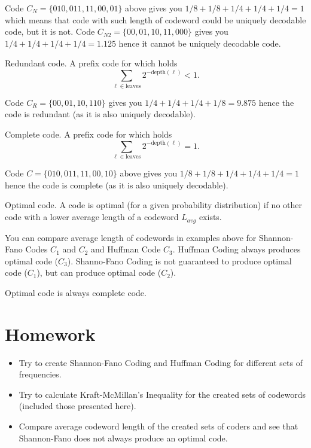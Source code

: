 Code $C_N = \{010, 011, 11, 00, 01\}$ above gives you $1/8 + 1/8 + 1/4 + 1/4 + 1/4 = 1$ which means that code with such length of codeword could be uniquely decodable code, but it is not.
Code $C_{N2} = \{00, 01, 10, 11, 000\}$ gives you $1/4 + 1/4 + 1/4 + 1/4 = 1.125$ hence it cannot be uniquely decodable code.

\begin{dt}{Redundant code.}
  A prefix code for which holds $$\sum_{\ell \in \mathrm{leaves}} 2^{-\mathrm{depth}(\ell)} < 1.$$
\end{dt}

Code $C_{R} = \{00, 01, 10, 110\}$ gives you $1/4 + 1/4 + 1/4 + 1/8 = 9.875$ hence the code is redundant (as it is also uniquely decodable).

\begin{dt}{Complete code.}
  A prefix code for which holds $$\sum_{\ell \in \mathrm{leaves}} 2^{-\mathrm{depth}(\ell)} = 1.$$
\end{dt}

Code $C = \{010, 011, 11, 00, 10\}$ above gives you $1/8 + 1/8 + 1/4 + 1/4 + 1/4 = 1$ hence the code is complete (as it is also uniquely decodable).

\begin{dt}{Optimal code.}
    A code is optimal (for a given probability distribution) if no other code with a lower average length of a codeword $L_{avg}$ exists.
\end{dt}

You can compare average length of codewords in examples above for Shannon-Fano Codes $C_1$ and $C_2$ and Huffman Code $C_3$. Huffman Coding always produces optimal code ($C_3$). Shanno-Fano Coding is not guaranteed to produce optimal code ($C_1$), but can produce optimal code ($C_2$). 

Optimal code is always complete code.

\section{Homework}

\begin{itemize}
  \item Try to create Shannon-Fano Coding and Huffman Coding for different sets of frequencies.
  \item Try to calculate Kraft-McMillan's Inequality for the created sets of codewords (included those presented here).
  \item Compare average codeword length of the created sets of coders and see that Shannon-Fano does not always produce an optimal code.
\end{itemize}
